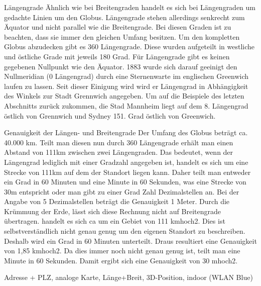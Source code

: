 Längengrade
Ähnlich wie bei Breitengraden handelt es sich bei Längengraden um gedachte Linien um den Globus. Längengrade stehen allerdings senkrecht zum Äquator und nicht parallel wie die Breitengrade. Bei diesen Graden ist zu beachten, dass sie immer den gleichen Umfang besitzen. Um den kompletten Globus abzudecken gibt es 360 Längengrade. Diese wurden aufgeteilt in westliche und östliche Grade mit jeweils 180 Grad. Für Längengrade gibt es keinen gegebenen Nullpunkt wie den Äquator. 1883 wurde sich darauf geeinigt den Nullmeridian (0 Längengrad) durch eine Sternenwarte im englischen Greenwich laufen zu lassen. Seit dieser Einigung wird wird er Längengrad in Abhängigkeit des Winkels zur Stadt Grennwich angegeben. 
Um auf die Beispiele des letzten Abschnitts zurück zukommen, die Stad Mannheim liegt auf dem 8. Längengrad östlich von Grennwich und Sydney 151. Grad östlich von Greenwich.

Genauigkeit der Längen- und Breitengrade
Der Umfang des Globus beträgt ca. 40.000 km. Teilt man diesen nun durch 360 Längengrade erhält man einen Abstand von 111km zwischen zwei Längengraden. Das bedeutet, wenn der Längengrad  lediglich mit einer Gradzahl angegeben ist, handelt es sich um eine Strecke von 111km auf dem der Standort liegen kann. Daher teilt man entweder ein Grad in 60 Minuten und eine Minute in 60 Sekunden, was eine Strecke von 30m entspricht oder man gibt zu einer Grad Zahl Dezimalstellen an. Bei der Angabe von 5 Dezimalstellen beträgt die Genauigkeit 1 Meter.
Durch die Krümmung der Erde, lässt sich diese Rechnung nicht auf Breitengrade übertragen. 
handelt es sich ca um ein Gebiet von 111 kmhoch2. Dies ist selbstverständlich nicht genau genug um den eigenen Standort zu beschreiben. Deshalb wird ein Grad in 60 Minuten unterteilt. Draus resultiert eine Genauigkeit von 1,85 kmhoch2. Da dies immer noch nicht genau genug ist, teilt man eine Minute in 60 Sekunden. Damit ergibt sich eine Genauigkeit von 30 mhoch2. 


Adresse + PLZ, analoge Karte, Länge+Breit, 3D-Position, indoor (WLAN Blue)